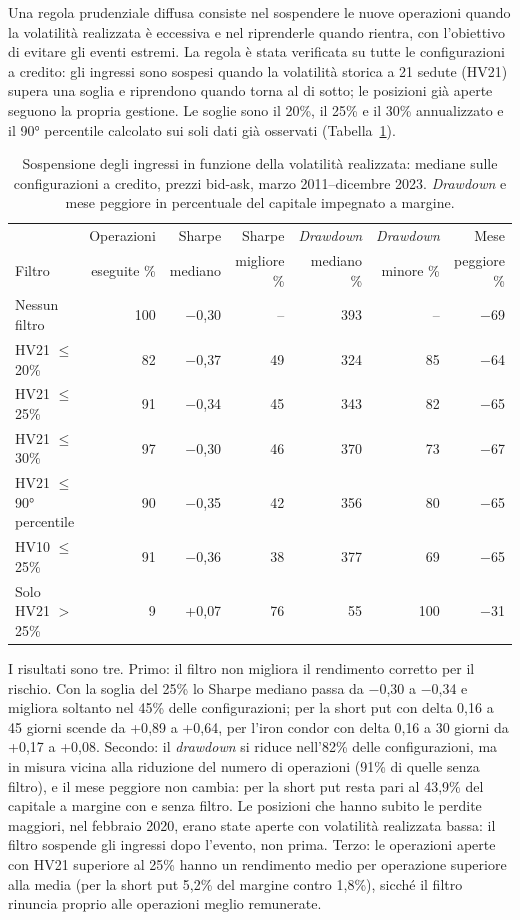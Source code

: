\documentclass[11pt,a4paper]{article}
\begin{document}
Una regola prudenziale diffusa consiste nel sospendere le nuove operazioni quando la volatilità realizzata è eccessiva e nel riprenderle quando rientra, con l'obiettivo di evitare gli eventi estremi. La regola è stata verificata su tutte le configurazioni a credito: gli ingressi sono sospesi quando la volatilità storica a 21 sedute (HV21) supera una soglia e riprendono quando torna al di sotto; le posizioni già aperte seguono la propria gestione. Le soglie sono il 20\%, il 25\% e il 30\% annualizzato e il 90° percentile calcolato sui soli dati già osservati (Tabella~\ref{tab:fvol}).

\begin{table}[ht]\centering\small
\caption{Sospensione degli ingressi in funzione della volatilità realizzata: mediane sulle configurazioni a credito, prezzi bid-ask, marzo 2011--dicembre 2023. \emph{Drawdown} e mese peggiore in percentuale del capitale impegnato a margine.}\label{tab:fvol}
\begin{tabular}{lrrrrrr}\toprule
 & Operazioni & Sharpe & Sharpe & \emph{Drawdown} & \emph{Drawdown} & Mese \\
Filtro & eseguite \% & mediano & migliore \% & mediano \% & minore \% & peggiore \% \\ \midrule
Nessun filtro & 100 & $-$0{,}30 & -- & 393 & -- & $-$69 \\
HV21 $\le$ 20\% & 82 & $-$0{,}37 & 49 & 324 & 85 & $-$64 \\
HV21 $\le$ 25\% & 91 & $-$0{,}34 & 45 & 343 & 82 & $-$65 \\
HV21 $\le$ 30\% & 97 & $-$0{,}30 & 46 & 370 & 73 & $-$67 \\
HV21 $\le$ 90° percentile & 90 & $-$0{,}35 & 42 & 356 & 80 & $-$65 \\
HV10 $\le$ 25\% & 91 & $-$0{,}36 & 38 & 377 & 69 & $-$65 \\
Solo HV21 $>$ 25\% & 9 & +0{,}07 & 76 & 55 & 100 & $-$31 \\
\bottomrule\end{tabular}\end{table}

I risultati sono tre. Primo: il filtro non migliora il rendimento corretto per il rischio. Con la soglia del 25\% lo Sharpe mediano passa da $-$0{,}30 a $-$0{,}34 e migliora soltanto nel 45\% delle configurazioni; per la short put con delta 0{,}16 a 45 giorni scende da +0{,}89 a +0{,}64, per l'iron condor con delta 0{,}16 a 30 giorni da +0{,}17 a +0{,}08. Secondo: il \emph{drawdown} si riduce nell'82\% delle configurazioni, ma in misura vicina alla riduzione del numero di operazioni (91\% di quelle senza filtro), e il mese peggiore non cambia: per la short put resta pari al 43{,}9\% del capitale a margine con e senza filtro. Le posizioni che hanno subito le perdite maggiori, nel febbraio 2020, erano state aperte con volatilità realizzata bassa: il filtro sospende gli ingressi dopo l'evento, non prima. Terzo: le operazioni aperte con HV21 superiore al 25\% hanno un rendimento medio per operazione superiore alla media (per la short put 5{,}2\% del margine contro 1{,}8\%), sicché il filtro rinuncia proprio alle operazioni meglio remunerate.
\end{document}
